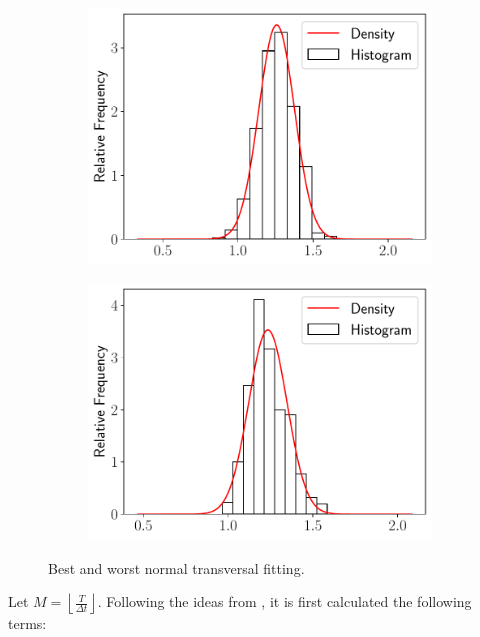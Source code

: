 \documentclass[11pt]{article}
\theoremstyle{definition}
\theoremstyle{remark}
\theoremstyle{remark}
\begin{document}
\begin{figure}
  \centering
  \begin{subfigure}[b]{0.45\textwidth}
    \centering
    \includegraphics[scale=.45]{maxp_histogram_forallT}
  \end{subfigure}
    \begin{subfigure}[b]{0.45\textwidth}
    \centering
    \includegraphics[scale=.45]{minp_histogram_forallT}
  \end{subfigure}
  \caption{Best and worst normal transversal fitting.}
  \label{fig:hist_norm2}
\end{figure}

Let $M = \left\lfloor \frac{T}{\Delta t} \right\rfloor$. Following the
ideas from \cite{marin2013}, it is first calculated the following
terms:
\end{document}

